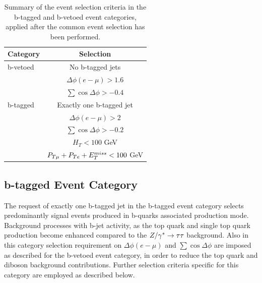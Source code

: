 \begin{table}[t]
  \begin{center}
    \begin{tabular}{p{4cm}c}
      \hline \hline
      Category & Selection \\ [3pt]
      \hline
      b-vetoed &  No b-tagged jets \\	
      & $\Delta\phi(e-\mu)>1.6$ \\
      & $\sum\cos\Delta\phi > -0.4$ \\[5pt]
      \hline
      b-tagged & Exactly one b-tagged  jet \\
      & $\Delta\phi(e-\mu)>2$ \\
      & $\sum\cos\Delta\phi > -0.2$ \\
      & $ H_T < 100$ GeV \\
      & $P_{T\mu} + P_{Te} + E_{T}^{miss} < 100$ GeV \\[3pt]
      \hline \hline
    \end{tabular}
    \caption{Summary of the event selection criteria in the b-tagged and b-vetoed event categories, applied after the common 
	event selection has been performed.}
    \label{tab:sel}
  \end{center}
\end{table}

\subsection{b-tagged Event Category}\label{sec:tag}
The request of exactly one b-tagged jet in the b-tagged event category selects predominantly signal events produced 
in  b-quarks associated production mode.
Background processes with b-jet activity, as the top quark and single top quark production become enhanced compared to the $Z/\gamma^*\rightarrow \tau\tau$ background.
Also in this category selection requirement on $\Delta\phi(e-\mu)$ and $\sum\cos\Delta\phi$  are imposed as described for the b-vetoed event category,
in order to reduce the top quark and diboson background contributions. Further selection criteria specific for  this category
are employed  as described below.

